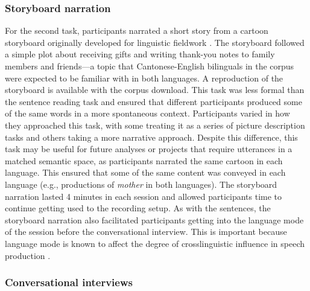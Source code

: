 \subsubsection{Storyboard narration}\label{ch2:subsec:storyboard}

For the second task, participants narrated a short story from a cartoon storyboard originally developed for linguistic fieldwork \citep{littell_2010_thank}. The storyboard followed a simple plot about receiving gifts and writing thank-you notes to family members and friends---a topic that Cantonese-English bilinguals in the corpus were expected to be familiar with in both languages. A reproduction of the storyboard is available with the corpus download. This task was less formal than the sentence reading task and ensured that different participants produced some of the same words in a more spontaneous context. Participants varied in how they approached this task, with some treating it as a series of picture description tasks and others taking a more narrative approach. Despite this difference, this task may be useful for future analyses or projects that require utterances in a matched semantic space, as participants narrated the same cartoon in each language. This ensured that some of the same content was conveyed in each language (e.g., productions of \textit{mother} in both languages). The storyboard narration lasted 4 minutes in each session and allowed participants time to continue getting used to the recording setup. As with the sentences, the storyboard narration also facilitated participants getting into the language mode of the session before the conversational interview. This is important because language mode is known to affect the degree of crosslinguistic influence in speech production \citep{simonet_2019_convergence}.

\subsubsection{Conversational interviews}\label{ch2:subsec:interview}

